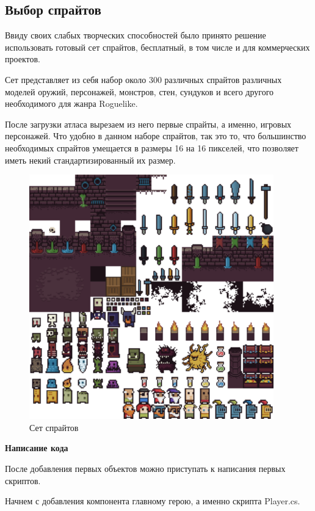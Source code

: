\documentclass[a4paper,12pt]{article}
\begin{document}
\newpage
\subsection{Выбор спрайтов}
Ввиду своих слабых творческих способностей было принято решение использовать готовый сет спрайтов, бесплатный, в том числе и для коммерческих проектов.

Сет представляет из себя набор около 300 различных спрайтов различных моделей оружий, персонажей, монстров, стен, сундуков и всего другого необходимого для жанра Roguelike.

После загрузки атласа вырезаем из него первые спрайты, а именно, игровых персонажей. Что удобно в данном наборе спрайтов, так это то, что большинство необходимых спрайтов умещается в размеры 16 на 16 пикселей, что позволяет иметь некий стандартизированный их размер.

\newpage
\begin{figure}[h]
\centering
\includegraphics[width = 400px]{pictures/Atlas.png}
\caption{Сет спрайтов}
\end{figure}

\newpage
\begin{center}
\textbf{Написание кода}\\
\end{center}
После добавления первых объектов можно приступать к написания первых скриптов.

Начнем с добавления компонента главному герою, а именно скрипта Player.cs.
\end{document}

